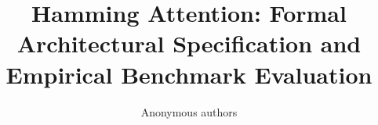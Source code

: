 \title{\textbf{Hamming Attention: Formal Architectural Specification and Empirical Benchmark Evaluation}}

\author{Anonymous authors}
